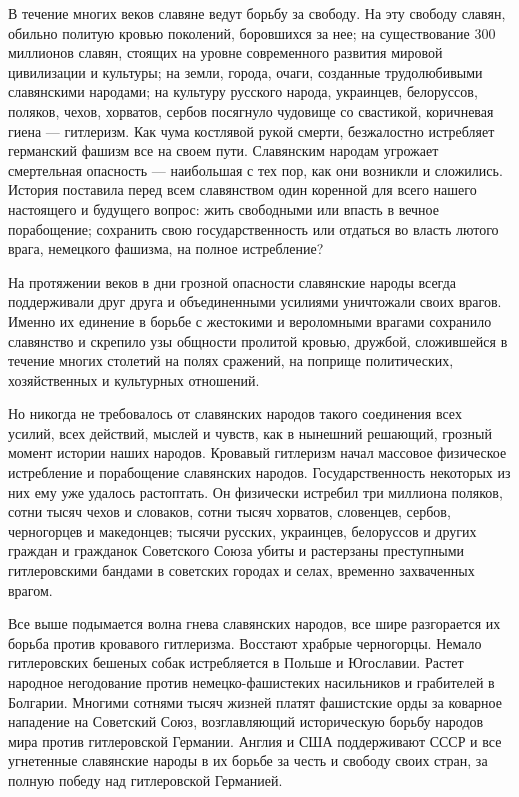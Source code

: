\documentclass[12pt, a4paper, openany]{book}
\begin{document}
В течение многих веков славяне ведут борьбу за свободу. На эту свободу славян, обильно политую кровью поколений, боровшихся за нее; на существование 300 миллионов славян, стоящих на уровне современного развития мировой цивилизации и культуры; на земли, города, очаги, созданные трудолюбивыми славянскими народами; на культуру русского народа, украинцев, белоруссов, поляков, чехов, хорватов, сербов посягнуло чудовище со свастикой, коричневая гиена — гитлеризм. Как чума костлявой рукой смерти, безжалостно истребляет германский фашизм все на своем пути. Славянским народам угрожает смертельная опасность --- наибольшая с тех пор, как они возникли и сложились. История поставила перед всем славянством один коренной для всего нашего настоящего и будущего вопрос: жить свободными или впасть в вечное порабощение; сохранить свою государственность или отдаться во власть лютого врага, немецкого фашизма, на полное истребление?

На протяжении веков в дни грозной опасности славянские народы всегда поддерживали друг друга и объединенными усилиями уничтожали своих врагов. Именно их единение в борьбе с жестокими и вероломными врагами сохранило славянство и скрепило узы общности пролитой кровью, дружбой, сложившейся в течение многих столетий на полях сражений, на поприще политических, хозяйственных и культурных отношений.

Но никогда не требовалось от славянских народов такого соединения всех усилий, всех действий, мыслей и чувств, как в нынешний решающий, грозный момент истории наших народов. Кровавый гитлеризм начал массовое физическое истребление и порабощение славянских народов. Государственность некоторых из них ему уже удалось растоптать. Он физически истребил три миллиона поляков, сотни тысяч чехов и словаков, сотни тысяч хорватов, словенцев, сербов, черногорцев и македонцев; тысячи русских, украинцев, белоруссов и других граждан и гражданок Советского Союза убиты и растерзаны преступными гитлеровскими бандами в советских городах и селах, временно захваченных врагом.

Все выше подымается волна гнева славянских народов, все шире разгорается их борьба против кровавого гитлеризма. Восстают храбрые черногорцы. Немало гитлеровских бешеных собак истребляется в Польше и Югославии. Растет народное негодование против немецко-фашистеких насильников и грабителей в Болгарии. Многими сотнями тысяч жизней платят фашистские орды за коварное нападение на Советский Союз, возглавляющий историческую борьбу народов мира против гитлеровской Германии. Англия и США поддерживают СССР и все угнетенные славянские народы в их борьбе за честь и свободу своих стран, за полную победу над гитлеровской Германией.
\end{document}
